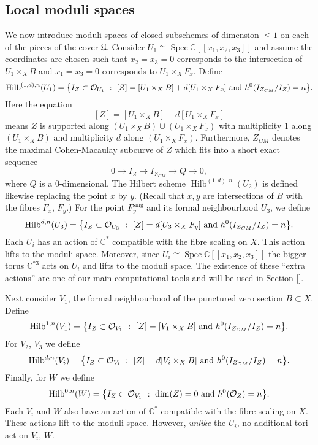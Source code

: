 \documentclass{amsart}
\theoremstyle{definition}
\newcommand{\CC} {\mathbb{C}}          %
\renewcommand{\O}{\mathcal{O}}
\newcommand{\Hilb}{\operatorname{Hilb}}
\newcommand{\Spec}{\operatorname{Spec}}
\newcommand{\sing}{\operatorname{sing}}
\begin{document}
\subsection{Local moduli spaces} \label{localmod}

We now introduce moduli spaces of closed subschemes of dimension $\leq 1$ on each of the pieces of the cover $\mathfrak{U}$. Consider $U_1 \cong \Spec \CC[\![ x_1,x_2,x_3]\!]$ and assume the coordinates are chosen such that $x_2=x_3=0$ corresponds to the intersection of $U_1 \times_X B$ and $x_1=x_3=0$ corresponds to $U_1 \times_X F_x$. Define
$$
\Hilb^{(1,d),n}(U_1) = \big\{ I_Z \subset \O_{U_1} \ : \ [Z] = [U_1 \times_X B] + d [U_1 \times_X F_x] \ {\rm{and}} \ h^0(I_{Z_{CM}} / I_Z) = n \big\}.
$$
Here the equation
$$
[Z] = [U_1 \times_X B] + d [U_1 \times_X F_x]
$$
means $Z$ is supported along $(U_1 \times_X B) \cup (U_1 \times_X F_x)$ with multiplicity 1 along $(U_1 \times_X B)$ and multiplicity $d$ along $(U_1 \times_X F_x)$. Furthermore, $Z_{CM}$ denotes the maximal Cohen-Macaulay subcurve of $Z$ which fits into a short exact sequence
$$
0 \longrightarrow I_{Z} \longrightarrow I_{Z_{CM}} \longrightarrow Q \longrightarrow 0, 
$$
where $Q$ is a 0-dimensional. The Hilbert scheme $\Hilb^{(1,d),n}(U_2)$ is defined likewise replacing the point $x$ by $y$. (Recall that $x,y$ are intersections of $B$ with the fibres $F_x$, $F_y$.) For the point $F_{y}^{\sing}$ and its formal neighbourhood $U_3$, we define
$$
\Hilb^{d,n}(U_3) = \big\{ I_Z \subset \O_{U_3} \ : \ [Z] = d [U_3 \times_X F_y] \ {\rm{and}} \ h^0(I_{Z_{CM}} / I_Z) = n \big\}.
$$
Each $U_i$ has an action of $\CC^*$ compatible with the fibre scaling on $X$. This action lifts to the moduli space. Moreover, since $U_i \cong \Spec \CC[\![x_1,x_2,x_3]\!]$ the bigger torus $\CC^{*3}$ acts on $U_i$ and lifts to the moduli space. The existence of these ``extra actions'' are one of our main computational tools and will be used in Section \ref{}.

Next consider $V_1$, the formal neighbourhood of the punctured zero section $B \subset X$. Define
$$
\Hilb^{1,n}(V_1) = \big\{ I_Z \subset \O_{V_1} \ : \ [Z] = [V_1 \times_X B] \ {\rm{and}} \ h^0(I_{Z_{CM}} / I_Z) = n \big\}.
$$
For $V_2$, $V_3$ we define
$$
\Hilb^{d,n}(V_i) = \big\{ I_Z \subset \O_{V_i} \ : \ [Z] = d [V_i \times_X B] \ {\rm{and}} \ h^0(I_{Z_{CM}} / I_Z) = n \big\}.
$$
Finally, for $W$ we define
$$
\Hilb^{0,n}(W) = \big\{ I_Z \subset \O_{V_1} \ : \ \dim(Z) = 0 \ {\rm{and}} \ h^0(\O_Z) = n \big\}.
$$
Each $V_i$ and $W$ also have an action of $\CC^*$ compatible with the fibre scaling on $X$. These actions lift to the moduli space. However, \emph{unlike} the $U_i$, no additional tori act on $V_i$, $W$.
\end{document}
